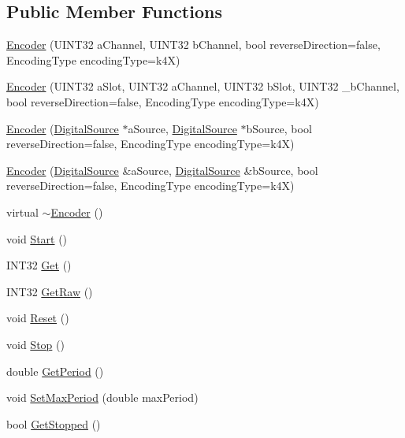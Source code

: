 \subsection*{\-Public \-Member \-Functions}
\begin{DoxyCompactItemize}
\item 
\hyperlink{classEncoder_ae47a6cd11da6de3a2b03f4456b98c39b}{\-Encoder} (\-U\-I\-N\-T32 a\-Channel, \-U\-I\-N\-T32 b\-Channel, bool reverse\-Direction=false, \-Encoding\-Type encoding\-Type=k4\-X)
\item 
\hyperlink{classEncoder_a6969b68195dfba60d3b87a38847400fa}{\-Encoder} (\-U\-I\-N\-T32 a\-Slot, \-U\-I\-N\-T32 a\-Channel, \-U\-I\-N\-T32 b\-Slot, \-U\-I\-N\-T32 \-\_\-b\-Channel, bool reverse\-Direction=false, \-Encoding\-Type encoding\-Type=k4\-X)
\item 
\hyperlink{classEncoder_aa5f1987f6278c0b45c801b129f8222c9}{\-Encoder} (\hyperlink{classDigitalSource}{\-Digital\-Source} $\ast$a\-Source, \hyperlink{classDigitalSource}{\-Digital\-Source} $\ast$b\-Source, bool reverse\-Direction=false, \-Encoding\-Type encoding\-Type=k4\-X)
\item 
\hyperlink{classEncoder_a3a6d83c9e78a0bef6990558e8cf676d4}{\-Encoder} (\hyperlink{classDigitalSource}{\-Digital\-Source} \&a\-Source, \hyperlink{classDigitalSource}{\-Digital\-Source} \&b\-Source, bool reverse\-Direction=false, \-Encoding\-Type encoding\-Type=k4\-X)
\item 
virtual \hyperlink{classEncoder_a87cc8067c98c0ab2134dee3822e3b250}{$\sim$\-Encoder} ()
\item 
void \hyperlink{classEncoder_ac998caf5c4685e1497cac25f25534c9d}{\-Start} ()
\item 
\-I\-N\-T32 \hyperlink{classEncoder_a4631259e214b2827220c9baff25e6891}{\-Get} ()
\item 
\-I\-N\-T32 \hyperlink{classEncoder_a59c47ec9ef74ec6e414911a5fd6931d0}{\-Get\-Raw} ()
\item 
void \hyperlink{classEncoder_a4375bf4d88d56f5f5d09860f9062d691}{\-Reset} ()
\item 
void \hyperlink{classEncoder_a2b4d86aa679b2b305739165ce24d0df0}{\-Stop} ()
\item 
double \hyperlink{classEncoder_a9825883787337876f6d62951d7eaac24}{\-Get\-Period} ()
\item 
void \hyperlink{classEncoder_a53e9481bd248b04a00809a3ea69d97c1}{\-Set\-Max\-Period} (double max\-Period)
\item 
bool \hyperlink{classEncoder_ad55bea74aa76140ea048d22bda8de855}{\-Get\-Stopped} ()

\end{DoxyCompactItemize}
